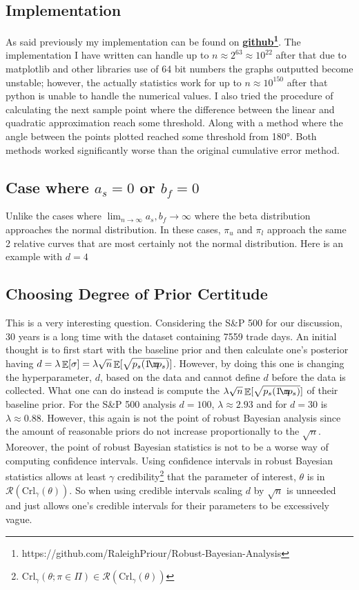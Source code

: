 \documentclass[12pt,letterpaper]{article}
\DeclareMathOperator*{\E}{\mathbb{E}}
\begin{document}
\subsection{Implementation}
As said previously my implementation can be found on \href{https://github.com/RaleighPriour/Robust-Bayesian-Analysis}{\textbf{github\footnote{https://github.com/RaleighPriour/Robust-Bayesian-Analysis}}}. 
The implementation I have written can handle up to $n\approx2^{63}\approx10^{22}$ after that due to matplotlib 
and other libraries use of 64 bit numbers the graphs outputted become unstable; 
however, the actually statistics work for up to $n\approx10^{150}$ after that python is unable to handle the numerical values.
I also tried the procedure of calculating the  next sample point where the difference between the linear and 
quadratic approximation reach some threshold. Along with a method where the angle between the points plotted 
reached some threshold from 180°. Both methods worked significantly worse than the original cumulative error method.
\subsection{Case where $a_s=0$ or $b_f=0$}
Unlike the cases where $\displaystyle \lim_{n \to \infty } a_s,b_f \!\to \infty$ where the beta distribution approaches the normal distribution.
In these cases, $\pi_u$ and $\pi_l$ approach the same 2 relative curves that are most certainly not the 
normal distribution. Here is an example with $d=4$
\noindent
\begin{center}
   
   
\end{center}
\subsection{Choosing Degree of Prior Certitude}
This is a very interesting question. Considering the S\&P 500 for our discussion, 30 years is a long time with the dataset containing 7559 
trade days. An initial thought is to first start with the baseline prior and then calculate one's posterior having 
$d=\lambda\E[\sigma]=\lambda\sqrt{n}\E[\sqrt{p_s(1\!\m\!p_s)}]$. However, by doing this one is changing the hyperparameter, $d$, based on the data 
and cannot define $d$ before the data is collected.
What one can do instead is compute the $\lambda\sqrt{n}\E[\sqrt{p_s(1\!\m\!p_s)}]$ of their baseline prior. 
For the S\&P 500 analysis $d=100$, $\lambda\approx2.93$ and for $d=30$ is $\lambda\approx0.88$. 
However, this again is not the point of robust Bayesian analysis since 
the amount of reasonable priors do not increase proportionally to the $\sqrt{n}$. 
Moreover, the point of robust Bayesian statistics is not to be a worse way of computing confidence intervals. Using 
confidence intervals in robust Bayesian statistics allows at least $\gamma$ credibility\footnote{$\text{Crl}_{\gamma}(\theta;\pi\in\Pi)\in\mathcal{R}(\text{Crl}_{\gamma}(\theta))$} that the 
parameter of interest, $\theta$ is in \mbox{$\mathcal{R}(\text{Crl}_{\gamma}(\theta))$}. 
So when using credible intervals scaling $d$ by $\sqrt{n}$ is unneeded and just allows one's 
credible intervals for their parameters to be excessively vague.
\end{document}
